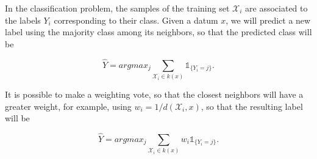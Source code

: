 
In the classification problem, the samples of the training set
$\mathcal{X}_i$ are associated to the labels $Y_i$ corresponding to their class.
Given a datum $x$, we will predict a new label using the majority class among
its neighbors, so that the predicted class will be

$$
\hat Y = argmax_j \sum_{\mathcal{X}_i \in k(x)} \mathbb{1}_{\{ Y_i = j\}}.
$$

It is possible to make a weighting vote, so that the closest neighbors will have
a greater weight, for example, using $w_i=1/d(\mathcal{X}_i, x)$, so that the
resulting label will be

$$
\hat Y = argmax_j \sum_{\mathcal{X}_i \in k(x)} w_i\mathbb{1}_{\{ Y_i = j\}}.
$$
